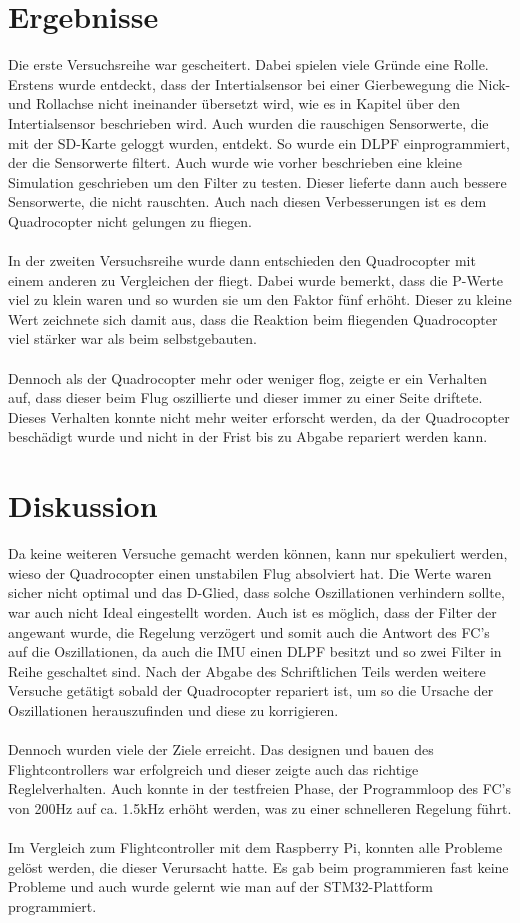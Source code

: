 \documentclass[12pt,a4paper, ngerman]{article}
\begin{document}
\section{Ergebnisse}
Die erste Versuchsreihe war gescheitert. Dabei spielen viele Gründe eine Rolle. Erstens wurde entdeckt, dass der Intertialsensor bei einer Gierbewegung die Nick-und Rollachse nicht ineinander übersetzt wird, wie es in Kapitel über den Intertialsensor beschrieben wird. Auch wurden die rauschigen Sensorwerte, die mit der SD-Karte geloggt wurden, entdekt. So wurde ein DLPF einprogrammiert, der die Sensorwerte filtert. Auch wurde wie vorher beschrieben eine kleine Simulation geschrieben um den Filter zu testen. Dieser lieferte dann auch bessere Sensorwerte, die nicht rauschten. Auch nach diesen Verbesserungen ist es dem Quadrocopter nicht gelungen zu fliegen. \\ \\In der zweiten Versuchsreihe wurde dann entschieden den Quadrocopter mit einem anderen zu Vergleichen der fliegt. Dabei wurde bemerkt, dass die P-Werte viel zu klein waren und so wurden sie um den Faktor fünf erhöht. Dieser zu kleine Wert zeichnete sich damit aus, dass die Reaktion beim fliegenden Quadrocopter viel stärker war als beim selbstgebauten. \\ \\ Dennoch als der Quadrocopter mehr oder weniger flog, zeigte er ein Verhalten auf, dass dieser beim Flug oszillierte und dieser immer zu einer Seite driftete. Dieses Verhalten konnte nicht mehr weiter erforscht werden, da der Quadrocopter beschädigt wurde und nicht in der Frist bis zu Abgabe repariert werden kann.
\newpage
\section{Diskussion}
Da keine weiteren Versuche gemacht werden können, kann nur spekuliert werden, wieso der Quadrocopter einen unstabilen Flug absolviert hat. Die Werte waren sicher nicht optimal und das D-Glied, dass solche Oszillationen verhindern sollte, war auch nicht Ideal eingestellt worden. Auch ist es möglich, dass der Filter der angewant wurde, die Regelung verzögert und somit auch die Antwort des FC's auf die Oszillationen, da auch die IMU einen DLPF besitzt und so zwei Filter in Reihe geschaltet sind. Nach der Abgabe des Schriftlichen Teils werden weitere Versuche getätigt sobald der Quadrocopter repariert ist, um so die Ursache der Oszillationen herauszufinden und diese zu korrigieren. \\ \\ Dennoch wurden viele der Ziele erreicht. Das designen und bauen des Flightcontrollers war erfolgreich und dieser zeigte auch das richtige Reglelverhalten. Auch konnte in der testfreien Phase, der Programmloop des FC's von 200Hz auf ca. 1.5kHz erhöht werden, was zu einer schnelleren Regelung führt.  \\ \\
Im Vergleich zum Flightcontroller mit dem Raspberry Pi, konnten alle Probleme gelöst werden, die dieser Verursacht hatte. Es gab beim programmieren fast keine Probleme und auch wurde gelernt wie man auf der STM32-Plattform programmiert. 
\end{document}
